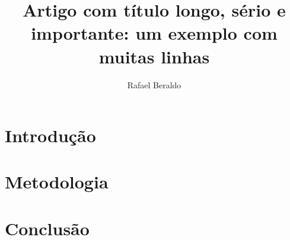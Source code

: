 \documentclass[11pt,a4paper,oneside]{article}
\title{Artigo com título longo, sério e importante: um exemplo com muitas linhas}
\author{Rafael Beraldo}
\begin{document}
\frenchspacing

\maketitle

\begin{abstract}
  \blindtext
\end{abstract}

\tableofcontents

\section{Introdução}
\blindtext

\section{Metodologia}
\blindtext

\section{Conclusão}
\blindtext
\end{document}

